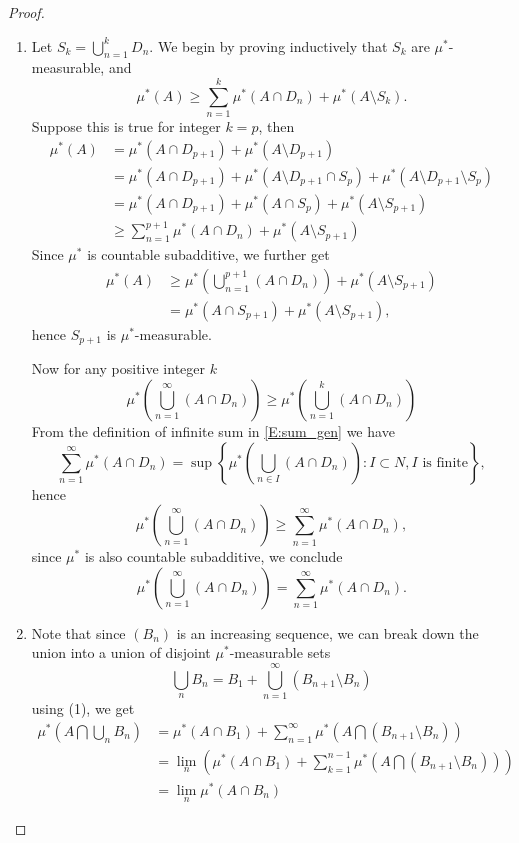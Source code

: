 \begin{proof}
\begin{enumerate}
\item[(1)]
Let $S_k=\bigcup_{n=1}^k D_n$. 
We begin by proving inductively that $S_k$ are $\mu^*$-measurable, and
\begin{equation}
    \mu^*(A) \ge \sum_{n=1}^{k} \mu^*(A\cap D_n) + \mu^*(A\setminus S_k).
\end{equation}
Suppose this is true for integer $k=p$, then
\begin{align*}
  \mu^*(A) 
    &= \mu^*(A\cap D_{p+1}) + \mu^*(A\setminus D_{p+1}) \\
    &= \mu^*(A\cap D_{p+1}) + \mu^*(A\setminus D_{p+1} \cap S_p) 
       + \mu^*(A\setminus D_{p+1} \setminus S_p)  \\
    &= \mu^*(A\cap D_{p+1}) + \mu^*(A\cap S_p) + \mu^*(A\setminus S_{p+1}) \\
    &\ge \sum_{n=1}^{p+1} \mu^*(A\cap D_n) + \mu^*(A\setminus S_{p+1}) 
\end{align*}
Since $\mu^*$ is countable subadditive, we further get
\begin{align*}
  \mu^*(A)
    &\ge \mu^*(\bigcup_{n=1}^{p+1} (A\cap D_n)) + \mu^*(A\setminus S_{p+1}) \\
    &= \mu^*(A\cap S_{p+1}) + \mu^*(A\setminus S_{p+1}),
\end{align*}
hence $S_{p+1}$ is $\mu^*$-measurable.

Now for any positive integer $k$
\[
  \mu^*(\bigcup_{n=1}^{\infty} (A\cap D_n)) 
    \ge \mu^*(\bigcup_{n=1}^k (A\cap D_n))
\]
From the definition of infinite sum in \ref{E:sum_gen} we have
\[
  \sum_{n=1}^{\infty} \mu^*(A\cap D_n)
    =\sup 
     \left\{  
       \mu^*\left( \bigcup_{n\in I} (A\cap D_n) \right)
         : I\subset N, \text{$I$ is finite}
     \right\},
\]
hence
\[
  \mu^*(\bigcup_{n=1}^{\infty} (A\cap D_n)) 
    \ge \sum_{n=1}^{\infty} \mu^*(A\cap D_n),
\]
since $\mu^*$ is also countable subadditive, we conclude
\[
  \mu^*(\bigcup_{n=1}^{\infty} (A\cap D_n)) 
    = \sum_{n=1}^{\infty} \mu^*(A\cap D_n).
\]

\item[(2)]
Note that since $(B_n)$ is an increasing sequence, we can break down
the union into a union of disjoint $\mu^*$-measurable sets
\[
  \bigcup_n B_n = B_1 + \bigcup_{n=1}^{\infty} (B_{n+1}\setminus B_{n})
\]
using (1), we get
\begin{align*}
  \mu^*(A\bigcap \bigcup_n B_n) 
    &= \mu^*(A\cap B_1) + \sum_{n=1}^{\infty} \mu^*(A\bigcap (B_{n+1}\setminus B_{n})) \\
    &= \lim_n \left( 
      \mu^*(A\cap B_1) + \sum_{k=1}^{n-1} \mu^*(A\bigcap (B_{n+1}\setminus B_{n})) 
      \right) \\
    &= \lim_n \mu^*(A\cap B_n)
\end{align*}

\end{enumerate}
\end{proof}


